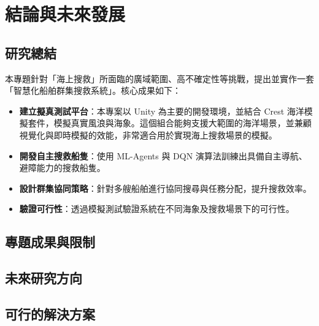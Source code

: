 \documentclass[12pt,a4paper]{ctexart}
\begin{document}
\section{結論與未來發展}

\subsection{研究總結}
本專題針對「海上搜救」所面臨的廣域範圍、高不確定性等挑戰，提出並實作一套「智慧化船舶群集搜救系統」。核心成果如下：
\begin{itemize}
    \item \textbf{建立擬真測試平台}：本專案以 Unity 為主要的開發環境，並結合 Crest 海洋模擬套件，模擬真實風浪與海象。這個組合能夠支援大範圍的海洋場景，並兼顧視覺化與即時模擬的效能，非常適合用於實現海上搜救場景的模擬。
    \item \textbf{開發自主搜救船隻}：使用 ML-Agents 與 DQN 演算法訓練出具備自主導航、避障能力的搜救船隻。
    \item \textbf{設計群集協同策略}：針對多艘船舶進行協同搜尋與任務分配，提升搜救效率。
    \item \textbf{驗證可行性}：透過模擬測試驗證系統在不同海象及搜救場景下的可行性。
\end{itemize}

\subsection{專題成果與限制}

\subsection{未來研究方向}

\subsection{可行的解決方案}
\end{document}
